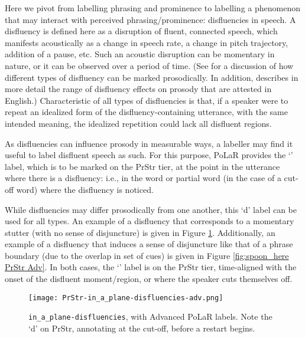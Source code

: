 Here we pivot from labelling phrasing and prominence to labelling a phenomenon that may interact with perceived phrasing\slash prominence: disfluencies in speech. A disfluency is defined here as a disruption of fluent, connected speech, which manifests acoustically as a change in speech rate, a change in pitch trajectory, addition of a pause, etc. Such an acoustic disruption can be momentary in nature, or it can be observed over a period of time. (See \citealt{shattuck-hufnagelcutler99} for a discussion of how different types of disfluency can be marked prosodically. In addition, \citealt{brugos-19} describes in more detail the range of disfluency effects on prosody that are attested in English.) Characteristic of all types of disfluencies is that, if a speaker were to repeat an idealized form of the disfluency-containing utterance, with the same intended meaning, the idealized repetition could lack all disfluent regions.

As disfluencies can influence prosody in measurable ways, a labeller may find it useful to label disfluent speech as such. For this purpose, PoLaR provides the ‘’ label, which is to be marked on the PrStr tier, at the point in the utterance where there is a disfluency: i.e., in the word or partial word (in the case of a cut-off word) where the disfluency is noticed.

While disfluencies may differ prosodically from one another, this ‘d’ label can be used for all types. An example of a disfluency that corresponds to a momentary stutter (with no sense of disjuncture) is given in Figure \ref{fig:in_a_plane-disfluencies PrStr Adv}. Additionally, an example of a disfluency that induces a sense of disjuncture like that of a phrase boundary (due to the overlap in set of cues) is given in Figure \ref{fig:spoon_here PrStr Adv}. In both cases, the ‘’ label is on the PrStr tier, time-aligned with the onset of the disfluent moment\slash region, or where the speaker cuts themselves off.

\begin{figure}[H]
\centering
%
\texttt{[image: PrStr-in\_a\_plane-disfluencies-adv.png]}
%
\caption[\texttt{in\_a\_plane-disfluencies}, with Advanced PoLaR labels.]{\texttt{in\_a\_plane-disfluencies}, with Advanced PoLaR labels. Note the ‘d’ on PrStr, annotating at the cut-off, before a restart begins.%
\label{fig:in_a_plane-disfluencies PrStr Adv}%
}
\end{figure}

